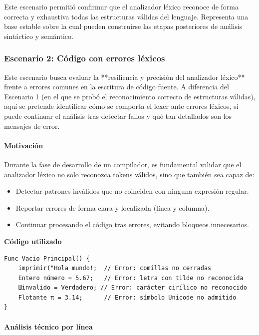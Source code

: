 \documentclass{article}
\begin{document}
Este escenario permitió confirmar que el analizador léxico reconoce de forma correcta y exhaustiva todas las estructuras válidas del lenguaje. Representa una base estable sobre la cual pueden construirse las etapas posteriores de análisis sintáctico y semántico.


\subsubsection{Escenario 2: Código con errores léxicos}

Este escenario busca evaluar la **resiliencia y precisión del analizador léxico** frente a errores comunes en la escritura de código fuente. A diferencia del Escenario 1 (en el que se probó el reconocimiento correcto de estructuras válidas), aquí se pretende identificar cómo se comporta el lexer ante errores léxicos, si puede continuar el análisis tras detectar fallos y qué tan detallados son los mensajes de error.

\paragraph{Motivación}

Durante la fase de desarrollo de un compilador, es fundamental validar que el analizador léxico no solo reconozca tokens válidos, sino que también sea capaz de:

\begin{itemize}
  \item Detectar patrones inválidos que no coinciden con ninguna expresión regular.
  \item Reportar errores de forma clara y localizada (línea y columna).
  \item Continuar procesando el código tras errores, evitando bloqueos innecesarios.
\end{itemize}

\textbf{Código utilizado}

\begin{lstlisting}[style=mypython, caption={Fragmento con errores léxicos intencionados}]
Func Vacio Principal() {
    imprimir("Hola mundo!;  // Error: comillas no cerradas
    Entero número = 5.67;   // Error: letra con tilde no reconocida
    Шinvalido = Verdadero; // Error: carácter cirílico no reconocido
    Flotante π = 3.14;      // Error: símbolo Unicode no admitido
}
\end{lstlisting}


\paragraph{Análisis técnico por línea}
\end{document}

